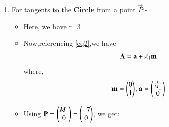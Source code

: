 \documentclass[journal,12pt,twocolumn]{IEEEtran}
\begin{document}
\begin{enumerate}
\begin{proof}
\begin{itemize}
\item Now,using \eqref{eq1} in above equation we get:
\begin{align}
    \implies  \myvec{M\textsubscript{1}&0}\vec{N} &=r^2 
    \\
    \implies   \myvec{1&0}\vec{N} &=\myvec{\frac{r^2}{M\textsubscript{1}}\\0} 
    \\
    \implies \vec{N}&=\myvec{\frac{r^2}{M\textsubscript{1}}\\0} +\lambda\myvec{0\\1}
  \\
    \implies \vec{N}&=\vec{n}+\lambda\vec{m} 
   \end{align}
    \begin{align}
   \text{where, }\vec{n}&=\myvec{\frac{r^2}{M\textsubscript{1}}\\0} \text{and }\vec{m}=\myvec{0\\1}
   \end{align}
\item Also we know,
\begin{align}
\norm{\vec{n}+\lambda\vec{m}}^2&=r^2
\\
(\vec{n}+\lambda \vec{m})^T(\vec{n}+\lambda \vec{m})&=r^2
\end{align}
\begin{align}
\lambda^2&=\frac{r^2-\norm{\vec{n}}^2}{\norm{\vec{m}}^2}
\\
\lambda &= \pm \sqrt{\frac{r^2-\norm{\vec{n}}^2}{\norm{\vec{m}}^2}} 
\end{align}
\end{itemize}
\end{proof}
\item For tangents to the \textbf{Circle} from a point $\vec{P}$:-
\begin{itemize}
\item Here, we have r=3
\item Now,referencing \eqref{eq2},we have
\begin{align}
 \vec{A}=\vec{a}+\lambda\textsubscript{1}\vec{m}   \label{eqa}
\end{align}
where,
\begin{align}
 \vec{m}=\myvec{0\\1},\vec{a}=\myvec{\frac{r}{M\textsubscript{1}}\\0}
 \end{align}
 \item Using $\vec{P}=\myvec{M\textsubscript{1}\\0}=\myvec{-7\\0}$, we get: 

\end{itemize}
\end{enumerate}
\end{document}
